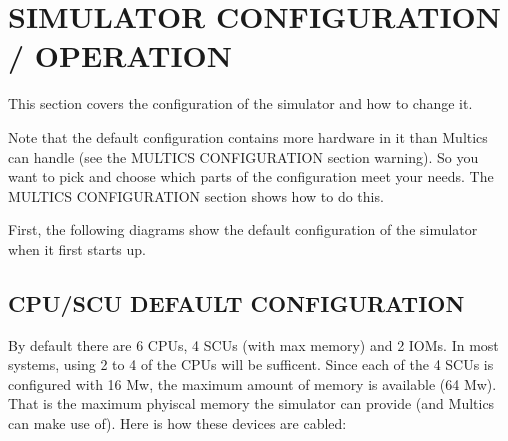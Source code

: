 
\section[Simulator Configuration / Operation]{SIMULATOR CONFIGURATION / OPERATION}

This section covers the configuration of the simulator and how to change it.

Note that the default configuration contains more hardware in it than Multics can handle (see the MULTICS CONFIGURATION section warning).
So you want to pick and choose which parts of the configuration meet your needs. The MULTICS CONFIGURATION section shows how to do this.

First, the following diagrams show the default configuration of the simulator
when it first starts up.

\subsection[CPU/SCU Default Configuration]{CPU/SCU DEFAULT CONFIGURATION}

By default there are 6 CPUs, 4 SCUs (with max memory) and 2 IOMs. In most systems, using 2 to 4 of the CPUs will be sufficent. Since each of the
4 SCUs is configured with 16 Mw, the maximum amount of memory is available (64 Mw). That is the maximum phyiscal memory the simulator can provide (and
Multics can make use of). Here is how these devices are cabled:

